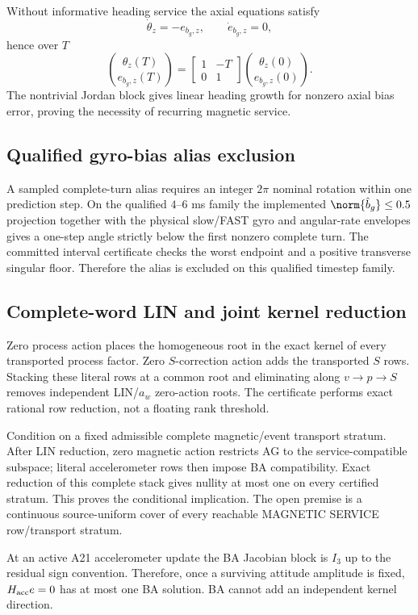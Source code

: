 Without informative heading service the axial equations satisfy
\[
\dot\theta_z=-e_{b_g,z},\qquad \dot e_{b_g,z}=0,
\]
hence over \(T\)
\[
\binom{\theta_z(T)}{e_{b_g,z}(T)}
=\begin{bmatrix}1&-T\\0&1\end{bmatrix}
\binom{\theta_z(0)}{e_{b_g,z}(0)}.
\]
The nontrivial Jordan block gives linear heading growth for nonzero axial bias error, proving the necessity of recurring magnetic service.

\subsection{Qualified gyro-bias alias exclusion}
A sampled complete-turn alias requires an integer \(2\pi\) nominal rotation within one prediction step. On the qualified \(4\)--\(6\) ms family the implemented \(\norm{\hat b_g}\le0.5\) projection together with the physical slow/FAST gyro and angular-rate envelopes gives a one-step angle strictly below the first nonzero complete turn. The committed interval certificate checks the worst endpoint and a positive transverse singular floor. Therefore the alias is excluded on this qualified timestep family.

\subsection{Complete-word LIN and joint kernel reduction}
Zero process action places the homogeneous root in the exact kernel of every transported process factor. Zero \(S\)-correction action adds the transported \(S\) rows. Stacking these literal rows at a common root and eliminating along \(v\to p\to S\) removes independent LIN/\(a_w\) zero-action roots. The certificate performs exact rational row reduction, not a floating rank threshold.

Condition on a fixed admissible complete magnetic/event transport stratum. After LIN reduction, zero magnetic action restricts AG to the service-compatible subspace; literal accelerometer rows then impose BA compatibility. Exact reduction of this complete stack gives nullity at most one on every certified stratum. This proves the conditional implication. The open premise is a continuous source-uniform cover of every reachable MAGNETIC SERVICE row/transport stratum.

At an active A21 accelerometer update the BA Jacobian block is \(I_3\) up to the residual sign convention. Therefore, once a surviving attitude amplitude is fixed, \(H_{\rm acc}e=0\) has at most one BA solution. BA cannot add an independent kernel direction.

